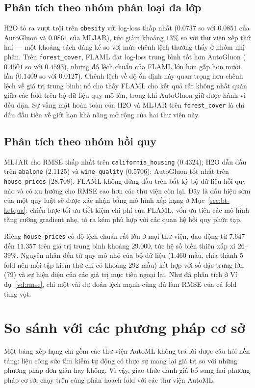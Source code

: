 \subsection{Phân tích theo nhóm phân loại đa lớp}
H2O tỏ ra vượt trội trên \texttt{obesity} với log-loss thấp nhất ($0.0737$ so với
$0.0851$ của AutoGluon và $0.0861$ của MLJAR), tức giảm khoảng $13\%$ so với thư
viện xếp thứ hai --- một khoảng cách đáng kể so với mức chênh lệch thường thấy ở
nhóm nhị phân. Trên \texttt{forest\_cover}, FLAML đạt log-loss trung bình tốt hơn
AutoGluon ($0.4501$ so với $0.4593$), nhưng độ lệch chuẩn của FLAML lớn hơn gấp
hơn mười lần ($0.1409$ so với $0.0127$). Chênh lệch về độ ổn định này quan trọng
hơn chênh lệch về giá trị trung bình: nó cho thấy FLAML cho kết quả rất không nhất
quán giữa các fold trên bộ dữ liệu quy mô lớn, trong khi AutoGluon giữ được hành
vi đều đặn. Sự vắng mặt hoàn toàn của H2O và MLJAR trên \texttt{forest\_cover} là
chỉ dấu đầu tiên về giới hạn khả năng mở rộng của hai thư viện này.

\subsection{Phân tích theo nhóm hồi quy}
MLJAR cho RMSE thấp nhất trên \texttt{california\_housing} ($0.4324$); H2O dẫn đầu
trên \texttt{abalone} ($2.1125$) và \texttt{wine\_quality} ($0.5706$); AutoGluon
tốt nhất trên \texttt{house\_prices} ($28.708$). FLAML không đứng đầu trên bất kỳ
bộ dữ liệu hồi quy nào và có xu hướng cho RMSE cao hơn các thư viện còn lại. Đây
là dấu hiệu sớm của một quy luật sẽ được xác nhận bằng mô hình xếp hạng ở
Mục~\ref{sec:bt-ketqua}: chiến lược tối ưu tiết kiệm chi phí của FLAML, vốn ưu
tiên các mô hình tăng cường gradient nhẹ, tỏ ra kém phù hợp với các quan hệ hồi
quy phức tạp.

Riêng \texttt{house\_prices} có độ lệch chuẩn rất lớn ở mọi thư viện, dao động từ
$7.647$ đến $11.357$ trên giá trị trung bình khoảng $29.000$, tức hệ số biến thiên
xấp xỉ $26$--$39\%$. Nguyên nhân đến từ quy mô nhỏ của bộ dữ liệu (1.460 mẫu, chia
thành 5 fold nên mỗi tập kiểm thử chỉ có khoảng 292 mẫu) kết hợp với số đặc trưng
lớn (79) và sự hiện diện của các giá trị mục tiêu ngoại lai. Như đã phân tích ở
Ví dụ~\ref{vd:rmse}, chỉ một vài dự đoán lệch mạnh cũng đủ làm RMSE của cả fold
tăng vọt.

\section{So sánh với các phương pháp cơ sở}
\label{sec:baseline}
Một bảng xếp hạng chỉ gồm các thư viện AutoML không trả lời được câu hỏi nền tảng:
liệu công sức tìm kiếm tự động có thực sự mang lại giá trị so với những phương
pháp đơn giản hay không. Vì vậy, giao thức đánh giá bổ sung hai phương pháp cơ sở,
chạy trên cùng phân hoạch fold với các thư viện AutoML.

